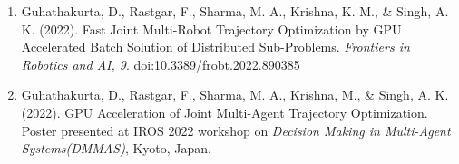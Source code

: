 \begin{enumerate}
    \item Guhathakurta, D., Rastgar, F., Sharma, M. A., Krishna, K. M., \& Singh, A. K. (2022). Fast Joint Multi-Robot Trajectory Optimization by GPU Accelerated Batch Solution of Distributed Sub-Problems. \textit{Frontiers in Robotics and AI, 9}. doi:10.3389/frobt.2022.890385
    
    \item Guhathakurta, D., Rastgar, F., Sharma, M. A., Krishna, M., \& Singh, A. K. (2022). GPU Acceleration of Joint Multi-Agent Trajectory Optimization. Poster presented at IROS 2022 workshop on \textit{Decision Making in Multi-Agent Systems(DMMAS)}, Kyoto, Japan.
\end{enumerate}

